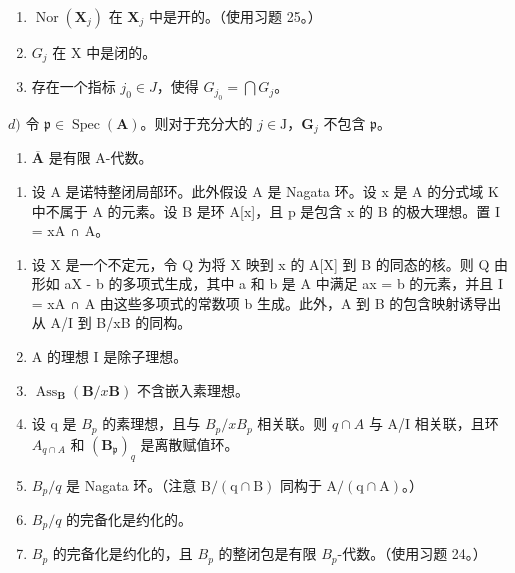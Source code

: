 \begin{enumerate}
\def\labelenumi{\alph{enumi})}
\item
  \(\operatorname{Nor}(\mathbf{X}_j)\) 在 \(\mathbf{X}_j\) 中是开的。（使用习题 25。）
\item
  \(G_{j}\) 在 X 中是闭的。
\item
  存在一个指标 \(j_0 \in J\)，使得 \(G_{j_0} = \bigcap G_j\)。
\end{enumerate}

\(d)\) 令 \(\mathfrak{p} \in \operatorname{Spec}(\mathbf{A})\)。则对于充分大的 \(j \in \mathrm{J}\)，\(\mathbf{G}_j\) 不包含 \(\mathfrak{p}\)。

\begin{enumerate}
\def\labelenumi{\alph{enumi})}
\setcounter{enumi}{4}
\tightlist
\item
  \(\overline{\mathbf{A}}\) 是有限 A-代数。
\end{enumerate}

\begin{enumerate}
\def\labelenumi{\arabic{enumi})}
\setcounter{enumi}{26}
\tightlist
\item
  设 A 是诺特整闭局部环。此外假设 A 是 Nagata 环。设 x 是 A 的分式域 K 中不属于 A 的元素。设 B 是环 A{[}x{]}，且 p 是包含 x 的 B 的极大理想。置 I = xA ∩ A。
\end{enumerate}

\begin{enumerate}
\def\labelenumi{\alph{enumi})}
\item
  设 X 是一个不定元，令 Q 为将 X 映到 x 的 A{[}X{]} 到 B 的同态的核。则 Q 由形如 aX - b 的多项式生成，其中 a 和 b 是 A 中满足 ax = b 的元素，并且 I = xA ∩ A 由这些多项式的常数项 b 生成。此外，A 到 B 的包含映射诱导出从 A/I 到 B/xB 的同构。
\item
  A 的理想 I 是除子理想。
\item
  \(\operatorname{Ass}_{\mathbf{B}}(\mathbf{B}/x\mathbf{B})\) 不含嵌入素理想。
\item
  设 q 是 \(B_{p}\) 的素理想，且与 \(B_{p}/xB_{p}\) 相关联。则 \(q \cap A\) 与 A/I 相关联，且环 \(A_{q \cap A}\) 和 \((\mathbf{B}_{\mathfrak{p}})_{q}\) 是离散赋值环。
\item
  \(B_{p}/q\) 是 Nagata 环。（注意 \(\mathrm{B}/(\mathrm{q} \cap \mathrm{B})\) 同构于 \(\mathrm{A}/(\mathrm{q} \cap \mathrm{A})\)。）
\item
  \(B_{p}/q\) 的完备化是约化的。
\item
  \(B_{p}\) 的完备化是约化的，且 \(B_{p}\) 的整闭包是有限 \(B_{p}\)-代数。（使用习题 24。）
\end{enumerate}

